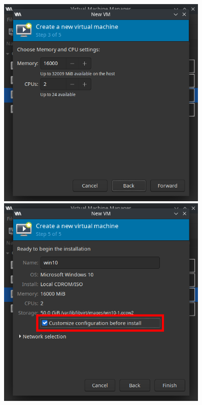 \documentclass[11pt]{article}
\begin{document}
\begin{figure}[h]
	\centering
	\begin{minipage}[b]{0.4\textwidth}
		\includegraphics[width=0.9\textwidth]{images/vm-memory-setup.png}
	\end{minipage}
	\begin{minipage}[b]{0.4\textwidth}
		\includegraphics[width=0.9\textwidth]{images/vm-name.png}
	\end{minipage}
\end{figure}
\end{document}
